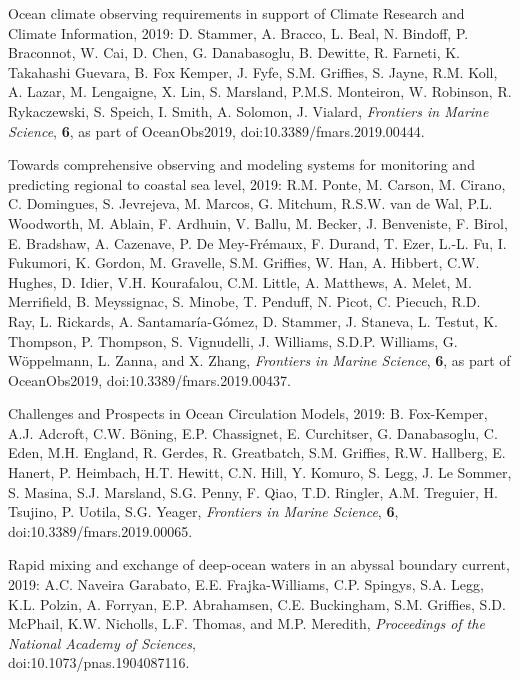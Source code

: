 \begin{etaremune}
\item Ocean climate observing requirements in support of Climate Research and Climate Information, 2019: D. Stammer, A. Bracco, L. Beal, N. Bindoff, P. Braconnot, W. Cai, D. Chen, G. Danabasoglu, B. Dewitte, R. Farneti, K. Takahashi Guevara, B. Fox Kemper, J. Fyfe, S.M. Grif\/f\/ies, S. Jayne, R.M. Koll, A. Lazar, M. Lengaigne, X. Lin, S. Marsland, P.M.S. Monteiron, W. Robinson, R. Rykaczewski, S. Speich, I. Smith, A. Solomon, J. Vialard, {\it Frontiers in Marine Science}, {\bf 6}, as part of OceanObs2019, doi:10.3389/fmars.2019.00444.

\item Towards comprehensive observing and modeling systems for monitoring and predicting regional to coastal sea level, 2019: R.M. Ponte, M. Carson, M. Cirano, C. Domingues, S. Jevrejeva, M. Marcos, G. Mitchum, R.S.W. van de Wal, P.L. Woodworth, M. Ablain, F. Ardhuin, V. Ballu, M. Becker, J. Benveniste, F. Birol, E. Bradshaw, A. Cazenave, P. De Mey-{Fr\'{e}maux}, F. Durand, T. Ezer, L.-L. Fu, I. Fukumori, K. Gordon, M. Gravelle, S.M. Grif\/f\/ies, W. Han, A. Hibbert, C.W. Hughes, D. Idier, V.H. Kourafalou, C.M. Little, A. Matthews, A. Melet, M. Merrifield, B. Meyssignac, S. Minobe, T. Penduff, N. Picot, C. Piecuch, R.D. Ray, L. Rickards, A. Santamaría-Gómez, D. Stammer, J. Staneva, L. Testut, K. Thompson, P. Thompson, S. Vignudelli, J. Williams, S.D.P. Williams, G. {W\"{o}ppelmann}, L. Zanna, and X. Zhang, {\it Frontiers in Marine Science}, {\bf 6},  as part of 
OceanObs2019, doi:10.3389/fmars.2019.00437.

\item Challenges and Prospects in Ocean Circulation Models, 2019: B. Fox-Kemper, A.J. Adcroft, C.W. {B\"{o}ning}, E.P. Chassignet, E. Curchitser, G. Danabasoglu, C. Eden, M.H. England, R. Gerdes, R. Greatbatch, S.M. Grif\/f\/ies, R.W. Hallberg, E. Hanert, P. Heimbach, H.T. Hewitt, C.N. Hill, Y. Komuro, S. Legg, J. Le Sommer, S. Masina, S.J. Marsland, S.G. Penny, F. Qiao, T.D. Ringler, A.M. Treguier, H. Tsujino, P. Uotila, S.G. Yeager,
{\it Frontiers in Marine Science}, {\bf 6},
doi:10.3389/fmars.2019.00065.

\item Rapid mixing and exchange of deep-ocean waters in an abyssal boundary current, 2019: A.C. Naveira Garabato, E.E. Frajka-Williams, C.P. Spingys, S.A. Legg, K.L. Polzin, A. Forryan, E.P. Abrahamsen, C.E. Buckingham, S.M. Grif\/f\/ies, S.D. McPhail, K.W. Nicholls, L.F. Thomas, and M.P. Meredith,  {\it Proceedings of the National Academy of Sciences}, \\ doi:10.1073/pnas.1904087116.


\end{etaremune}
